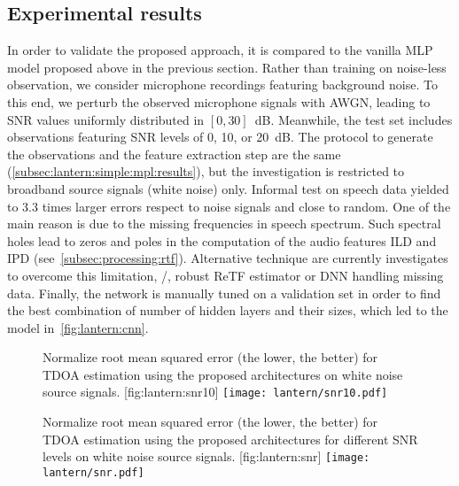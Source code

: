 \subsection{Experimental results}\label{subsec:lantern:simple:cnn:results}
In order to validate the proposed approach, it is compared to the vanilla \ac{MLP} model proposed above in the previous section.
Rather than training on noise-less observation, we consider microphone recordings featuring background noise.
To this end, we perturb the observed microphone signals with \acf{AWGN}, leading to \ac{SNR} values uniformly distributed in $[0, 30]$~dB.
Meanwhile, the test set includes observations featuring \ac{SNR} levels of 0, 10, or 20~dB.
The protocol to generate the observations and the feature extraction step are the same (\cref{subsec:lantern:simple:mpl:results}), but the investigation is restricted to broadband source signals (white noise) only.
Informal test on speech data yielded to 3.3 times larger errors respect to noise signals and close to random.
One of the main reason is due to the missing frequencies in speech spectrum.
Such spectral holes lead to zeros and poles in the computation of the audio features \ac{ILD} and \ac{IPD} (see~\cref{subsec:processing:rtf}).
Alternative technique are currently investigates to overcome this limitation, \eg/, robust \ac{ReTF} estimator or \ac{DNN} handling missing data.
Finally, the network is manually tuned on a validation set in order to find the best combination of number of hidden layers and their sizes, which led to the model in~\cref{fig:lantern:cnn}.
\begin{figure}[h]
    \begin{sidecaption}[]{%
        Normalize root mean squared error (the lower, the better) for \ac{TDOA} estimation using the proposed architectures on white noise source signals.
    }[fig:lantern:snr10]
    \centering
    \texttt{[image: lantern/snr10.pdf]}
    \end{sidecaption}
\end{figure}
\begin{figure}[h]
    \begin{sidecaption}[]{%
        Normalize root mean squared error (the lower, the better) for \ac{TDOA} estimation using the proposed architectures for different \ac{SNR} levels on white noise source signals.
    }[fig:lantern:snr]
    \centering
    \texttt{[image: lantern/snr.pdf]}
    \end{sidecaption}
\end{figure}

